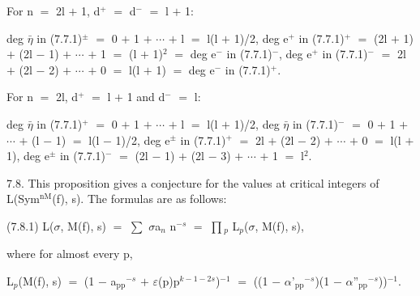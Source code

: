 \documentclass[10pt,twoside]{article}
\begin{document}
For n \ensuremath{=} 2l \ensuremath{+} 1, d\ensuremath{^{+}} \ensuremath{=} d\ensuremath{^{-}} \ensuremath{=} l \ensuremath{+} 1:\par
deg \ensuremath{\bar{η}} in (7.7.1)\ensuremath{^{±}} \ensuremath{=} 0 \ensuremath{+} 1 \ensuremath{+} \ensuremath{⋯} \ensuremath{+} l \ensuremath{=} l(l \ensuremath{+} 1)/2, deg e\ensuremath{^{+}} in (7.7.1)\ensuremath{^{+}} \ensuremath{=} (2l \ensuremath{+} 1) \ensuremath{+} (2l \ensuremath{−} 1) \ensuremath{+} \ensuremath{⋯} \ensuremath{+} 1 \ensuremath{=} (l \ensuremath{+} 1)\ensuremath{^{2}} \ensuremath{=} deg e\ensuremath{^{-}} in (7.7.1)\ensuremath{^{-}}, deg e\ensuremath{^{+}} in (7.7.1)\ensuremath{^{-}} \ensuremath{=} 2l \ensuremath{+} (2l \ensuremath{−} 2) \ensuremath{+} \ensuremath{⋯} \ensuremath{+} 0 \ensuremath{=} l(l \ensuremath{+} 1) \ensuremath{=} deg e\ensuremath{^{-}} in (7.7.1)\ensuremath{^{+}}.\par
For n \ensuremath{=} 2l, d\ensuremath{^{+}} \ensuremath{=} l \ensuremath{+} 1 and d\ensuremath{^{-}} \ensuremath{=} l:\par
deg \ensuremath{\bar{η}} in (7.7.1)\ensuremath{^{+}} \ensuremath{=} 0 \ensuremath{+} 1 \ensuremath{+} \ensuremath{⋯} \ensuremath{+} l \ensuremath{=} l(l \ensuremath{+} 1)/2, deg \ensuremath{\bar{η}} in (7.7.1)\ensuremath{^{-}} \ensuremath{=} 0 \ensuremath{+} 1 \ensuremath{+} \ensuremath{⋯} \ensuremath{+} (l \ensuremath{−} 1) \ensuremath{=} l(l \ensuremath{−} 1)/2, deg e\ensuremath{^{±}} in (7.7.1)\ensuremath{^{+}} \ensuremath{=} 2l \ensuremath{+} (2l \ensuremath{−} 2) \ensuremath{+} \ensuremath{⋯} \ensuremath{+} 0 \ensuremath{=} l(l \ensuremath{+} 1), deg e\ensuremath{^{±}} in (7.7.1)\ensuremath{^{-}} \ensuremath{=} (2l \ensuremath{−} 1) \ensuremath{+} (2l \ensuremath{−} 3) \ensuremath{+} \ensuremath{⋯} \ensuremath{+} 1 \ensuremath{=} l\ensuremath{^{2}}.\par
7.8. This proposition gives a conjecture for the values at critical integers of L(Sym\ensuremath{^{\mathrm{nM}}}(f), s). The formulas are as follows:\par
(7.8.1)    L(\ensuremath{σ}, M(f), s) \ensuremath{=} \ensuremath{∑} \ensuremath{σ}a\ensuremath{_{n}} n\ensuremath{^{-s}} \ensuremath{=} \ensuremath{∏}\ensuremath{_{p}} L\ensuremath{_{p}}(\ensuremath{σ}, M(f), s),\par
where for almost every p,\par
L\ensuremath{_{p}}(M(f), s) \ensuremath{=} (1 \ensuremath{−} a\ensuremath{_{\mathrm{pp}}}\ensuremath{^{-s}} \ensuremath{+} \ensuremath{ε}(p)p\ensuremath{^{k−1−2s}})\ensuremath{^{-1}} \ensuremath{=} ((1 \ensuremath{−} \ensuremath{α}'\ensuremath{_{\mathrm{pp}}}\ensuremath{^{-s}})(1 \ensuremath{−} \ensuremath{α}''\ensuremath{_{\mathrm{pp}}}\ensuremath{^{-s}}))\ensuremath{^{-1}}.\par
\end{document}
